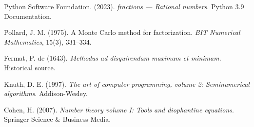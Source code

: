 \documentclass[12pt,a4paper]{article}
\begin{document}
	\begin{thebibliography}{99}
		Python Software Foundation. (2023). \textit{fractions --- Rational numbers}. Python 3.9 Documentation.
		
		Pollard, J. M. (1975). A Monte Carlo method for factorization. \textit{BIT Numerical Mathematics}, 15(3), 331--334.
		
		Fermat, P. de (1643). \textit{Methodus ad disquirendam maximam et minimam}. Historical source.
		
		Knuth, D. E. (1997). \textit{The art of computer programming, volume 2: Seminumerical algorithms}. Addison-Wesley.
		
		Cohen, H. (2007). \textit{Number theory volume I: Tools and diophantine equations}. Springer Science \& Business Media.
	\end{thebibliography}
	
\end{document}
